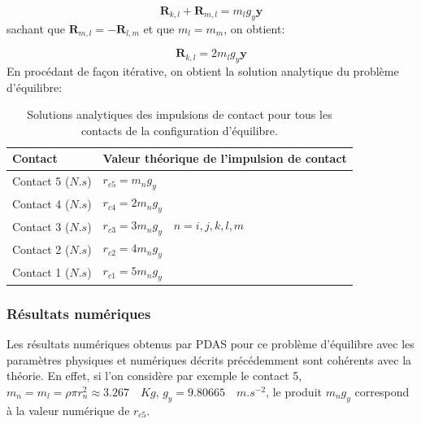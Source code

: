 \begin{equation}
    \textbf{R}_{k,l} + \textbf{R}_{m,l} = m_lg_y\textbf{y}
\end{equation}
 sachant que $\textbf{R}_{m,l} = - \textbf{R}_{l,m}$ et que $m_l = m_m$, on obtient:
 
 \begin{equation}
    \textbf{R}_{k,l} = 2m_lg_y\textbf{y}
\end{equation}
 En procédant de façon itérative, on obtient la solution analytique du problème d'équilibre:
 
 \begin{center}
 \begin{table}[!h]
\begin{tabular}{ |p{5.3cm}|p{7.2cm}| }
 \hline \rowcolor{lightgray}

 Contact& Valeur théorique de l'impulsion de contact\\
 \hline
 Contact 5 ($N.s$) & $r_{c5} = m_ng_y$\\
 Contact 4 ($N.s$) & $r_{c4} = 2m_ng_y$\\
 Contact 3 ($N.s$) & $r_{c3} = 3m_ng_y \quad n = i,j,k,l,m$\\
 Contact 2 ($N.s$) & $r_{c2} = 4m_ng_y$\\
 Contact 1 ($N.s$) & $r_{c1} = 5m_ng_y$\\
 \hline
\end{tabular}
\caption{Solutions analytiques des impulsions de contact pour tous les contacts de la configuration d'équilibre.}
\end{table}
\end{center}

\subsubsection{Résultats numériques}

Les résultats numériques obtenus par PDAS pour ce problème d'équilibre avec les paramètres physiques et numériques décrits précédemment sont cohérents avec la théorie. En effet, si l'on considère par exemple le contact 5, $m_n = m_l = \rho \pi r_n^{2} \approx 3.267 \quad Kg$,  $g_y = 9.80665 \quad m.s^{-2}$, le produit $m_ng_y$ correspond à la valeur numérique de $r_{c5}$.

